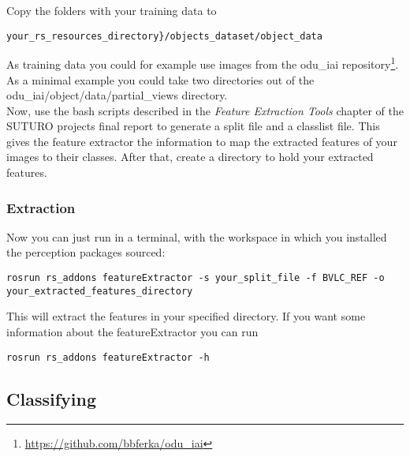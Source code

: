 \documentclass[main.tex]{subfiles}
\begin{document}
Copy the folders with your training data to 

\begin{lstlisting}
your_rs_resources_directory}/objects_dataset/object_data
\end{lstlisting}
As training data you could for example use images from the odu\_iai repository\footnote{\url{https://github.com/bbferka/odu_iai}}. As a minimal example you could take two directories out of the \linebreak odu\_iai/object/data/partial\_views directory.\\

Now, use the bash scripts described in the \textit{Feature Extraction Tools} chapter of the SUTURO projects final report to generate a split file and a classlist file. This gives the feature extractor the information to map the extracted features of your images to their classes.
After that, create a directory to hold your extracted features.

\subsubsection{Extraction}
Now you can just run in a terminal, with the workspace in which you installed the perception packages sourced:

\begin{lstlisting}
rosrun rs_addons featureExtractor -s your_split_file -f BVLC_REF -o your_extracted_features_directory
\end{lstlisting}

This will extract the features in your specified directory. If you want some information about the featureExtractor you can run

\begin{lstlisting}
rosrun rs_addons featureExtractor -h
\end{lstlisting}

\subsection{Classifying} \label{classifying}
 
\end{document}
